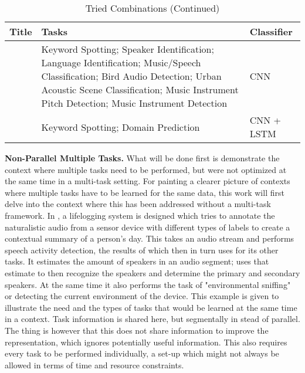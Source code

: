 \begin{table}[ht]
\caption{Tried Combinations (Continued)} %
\centering %
\begin{tabular}{p{}p{}p{}} %
\hline\hline %
Title & Tasks & Classifier   \\ [0.5ex] %
\hline %

		\citet{tagliasacchi2020multi} & Keyword Spotting; Speaker Identification; Language Identification; Music/Speech Classification; Bird Audio Detection; Urban Acoustic Scene Classification; Music Instrument Pitch Detection; Music Instrument Detection & CNN  \\ \hline
		\citet{wu2020domain} & Keyword Spotting; Domain Prediction & CNN + LSTM \\
		[1ex] %
		\hline %
	\end{tabular}
	\label{table:combinations3} %
\end{table}

\textbf{Non-Parallel Multiple Tasks.} What will be done first is demonstrate the context where multiple tasks need to be performed, but were not optimized at the same time in a multi-task setting. For painting a clearer picture of contexts where multiple tasks have to be learned for the same data, this work will first delve into the context where this has been addressed without a multi-task framework. In \citet{ziaei2013prof}, a lifelogging system is designed which tries to annotate the naturalistic audio from a sensor device with different types of labels to create a contextual summary of a person's day. This takes an audio stream and performs speech activity detection, the results of which then in turn uses for its other tasks. It estimates the amount of speakers in an audio segment; uses that estimate to then recognize the speakers and determine the primary and secondary speakers. At the same time it also performs the task of "environmental sniffing" or detecting the current environment of the device. This example is given to illustrate the need and the types of tasks that would be learned at the same time in a context. Task information is shared here, but segmentally in stead of parallel. The thing is however that this does not share information to improve the representation, which ignores potentially useful information. This also requires every task to be performed individually, a set-up which might not always be allowed in terms of time and resource constraints.\\

